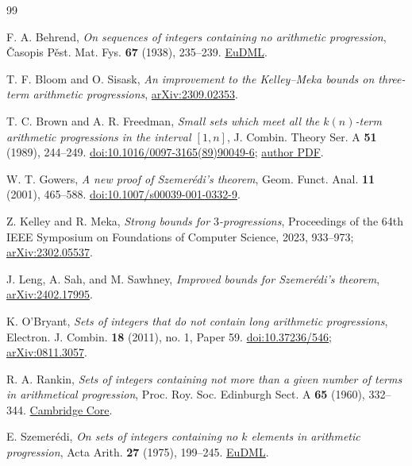 \documentclass[11pt]{article}
\theoremstyle{remark}
\numberwithin{equation}{section}
\begin{document}
\begin{thebibliography}{99}

F. A. Behrend,
\emph{On sequences of integers containing no arithmetic progression},
\v{C}asopis P\v{e}st. Mat. Fys. \textbf{67} (1938), 235--239.
\href{https://eudml.org/doc/25161}{EuDML}.

T. F. Bloom and O. Sisask,
\emph{An improvement to the Kelley--Meka bounds on three-term arithmetic progressions},
\href{https://arxiv.org/abs/2309.02353}{arXiv:2309.02353}.

T. C. Brown and A. R. Freedman,
\emph{Small sets which meet all the $k(n)$-term arithmetic progressions in the interval $[1,n]$},
J. Combin. Theory Ser. A \textbf{51} (1989), 244--249.
\href{https://doi.org/10.1016/0097-3165(89)90049-6}{doi:10.1016/0097-3165(89)90049-6};
\href{https://www.sfu.ca/~vjungic/tbrown/tom-38.pdf}{author PDF}.

W. T. Gowers,
\emph{A new proof of Szemer\'edi's theorem},
Geom. Funct. Anal. \textbf{11} (2001), 465--588.
\href{https://doi.org/10.1007/s00039-001-0332-9}{doi:10.1007/s00039-001-0332-9}.

Z. Kelley and R. Meka,
\emph{Strong bounds for $3$-progressions},
Proceedings of the 64th IEEE Symposium on Foundations of Computer Science, 2023, 933--973;
\href{https://arxiv.org/abs/2302.05537}{arXiv:2302.05537}.

J. Leng, A. Sah, and M. Sawhney,
\emph{Improved bounds for Szemer\'edi's theorem},
\href{https://arxiv.org/abs/2402.17995}{arXiv:2402.17995}.

K. O'Bryant,
\emph{Sets of integers that do not contain long arithmetic progressions},
Electron. J. Combin. \textbf{18} (2011), no. 1, Paper 59.
\href{https://doi.org/10.37236/546}{doi:10.37236/546};
\href{https://arxiv.org/abs/0811.3057}{arXiv:0811.3057}.

R. A. Rankin,
\emph{Sets of integers containing not more than a given number of terms in arithmetical progression},
Proc. Roy. Soc. Edinburgh Sect. A \textbf{65} (1960), 332--344.
\href{https://www.cambridge.org/core/journals/proceedings-of-the-royal-society-of-edinburgh-section-a-mathematics/article/xxivsets-of-integers-containing-not-more-than-a-given-number-of-terms-in-arithmetical-progression/7CB49707304932619FC2F3FB4A6BDE81}{Cambridge Core}.

E. Szemer\'edi,
\emph{On sets of integers containing no $k$ elements in arithmetic progression},
Acta Arith. \textbf{27} (1975), 199--245.
\href{https://eudml.org/doc/205339}{EuDML}.


\end{thebibliography}
\end{document}

